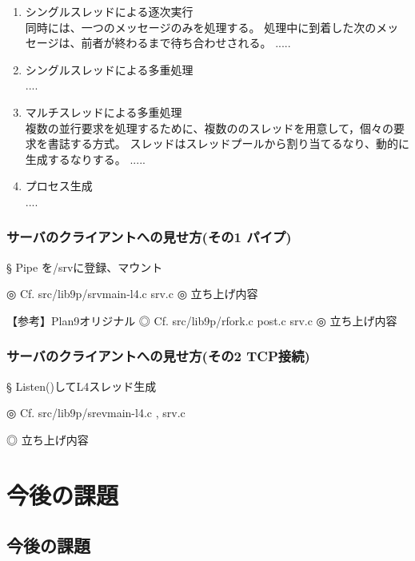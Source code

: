{\begin{enumerate}
\item  シングルスレッドによる逐次実行\\
      同時には、一つのメッセージのみを処理する。
      処理中に到着した次のメッセージは、前者が終わるまで待ち合わせされる。
    .....
    
\item  シングルスレッドによる多重処理\\
    ....    
    
\item  マルチスレッドによる多重処理\\
      複数の並行要求を処理するために、複数ののスレッドを用意して，個々の要求を書誌する方式。
      スレッドはスレッドプールから割り当てるなり、動的に生成するなりする。
    .....
    
\item  プロセス生成\\
     ....
\end{enumerate}    


\section{サーバのクライアントへの見せ方(その1 パイプ)}

    §   Pipe を/srvに登録、マウント

    ◎ Cf. src/lib9p/{srvmain-l4.c  srv.c  }   
    ◎ 立ち上げ内容



    【参考】Plan9オリジナル
    ◎ Cf. src/lib9p/{rfork.c  post.c  srv.c  }   
    ◎ 立ち上げ内容


\section{サーバのクライアントへの見せ方(その2 TCP接続)}


    §  Listen()してL4スレッド生成

    ◎ Cf. src/lib9p/{srevmain-l4.c    , srv.c}   

    ◎ 立ち上げ内容



\part{今後の課題}
\chapter{今後の課題}
 
}
